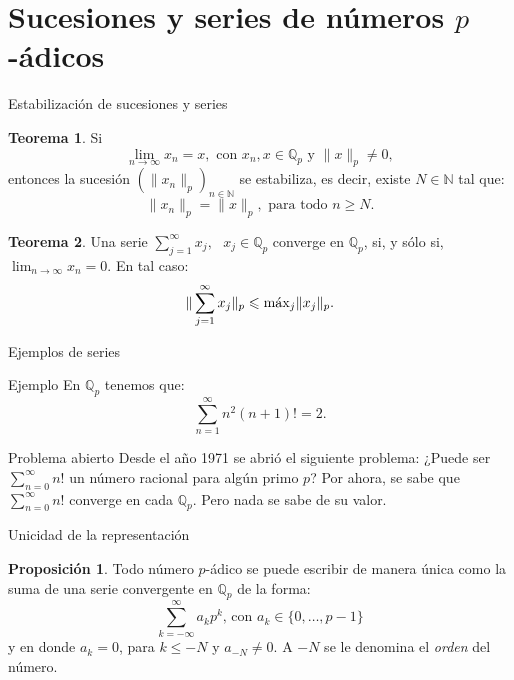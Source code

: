 \documentclass{beamer}
\newcommand{\bb}[1]{\mathbb{#1}}
\theoremstyle{definition}
\numberwithin{equation}{section}
\newcommand{\orangee}[1]{\textcolor{thColor}{#1}}
\newtheorem{thh}{\orangee{Teorema}}
\newtheorem{pr}{\orangee{Proposición}}
\renewcommand{\geq}{\geqslant}
\renewcommand{\leq}{\leqslant}
\newcommand{\N}{\mathbb{N}}
\newcommand{\Qp}{\mathbb{Q}_p}
\newcommand{\pnorm}[1]{\|#1\|_p}
\newcommand{\maxx}[1]{\text{m\'ax} #1}
\begin{document}
\section{Sucesiones y series de  números $p$-ádicos}

\begin{frame}{Estabilización de sucesiones y series}
\begin{thh}
	Si $$\lim_{n\to\infty}x_n=x, \text{ con } x_n,x\in\Qp\text{ y } \pnorm{x}\neq0 ,$$
	entonces la sucesión $ (\pnorm{x_n})_{n\in\N}$ se estabiliza, es decir, existe $N\in\N$ tal que:
	$$\pnorm{x_n}=\pnorm{x}, \text{ para todo } n\geq N.$$
\end{thh}
\begin{thh}
	Una serie $\sum_{j=1}^\infty x_j, \text{   } x_j\in\Qp$ converge en $\Qp$, si, y sólo si,  $\lim_{n\to\infty}x_n=0$. En tal caso:
	$$\pnorm{\sum_{j=1}^\infty x_j}\leq \maxx_{j}\pnorm{x_j}.$$
\end{thh}
\end{frame}

\begin{frame}{Ejemplos de series}
\begin{exampleblock}{Ejemplo}
	En $\bb{Q}_p$ tenemos que: $$	\sum_{n=1}^{\infty} n^{2}  (n+1) !=2.$$ 
\end{exampleblock}
\begin{block}{Problema abierto}
	Desde el año 1971 se abrió el siguiente problema:
	¿Puede ser $\sum_{n=0}^{\infty}n!$ un número racional para algún primo $p$?
	Por ahora, se sabe que $\sum_{n=0}^{\infty}n!$ converge en cada $\Qp$. Pero nada se sabe de su valor.
\end{block}
\end{frame}

\begin{frame}{Unicidad de la representación}
	\begin{pr}
		Todo número $p$-ádico se puede escribir de manera única como la suma de una serie convergente en  $\Qp$ de la forma:
		\begin{equation}
		\sum_{k=-\infty}^{\infty} a_{k} p^{k}\text{, con $a_k\in\{0,\dots,p-1\}$}	\label{eq:1}
		\end{equation}
		y en donde $a_k=0$, para $k\leq - N$ y $a_{-N}\neq 0$\label{ord_def_2}. A $-N$ se le denomina el \textit{orden} del número.
	\end{pr}
\end{frame}
\end{document}
